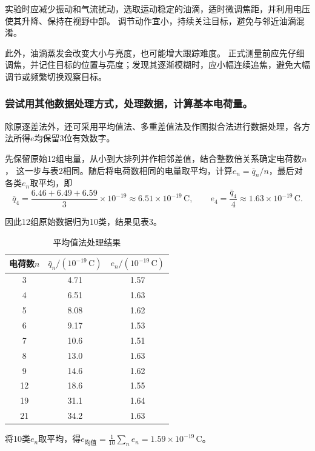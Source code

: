 \documentclass[10pt,a4paper]{ctexart} %
\begin{document}
    实验时应减少振动和气流扰动，选取运动稳定的油滴，适时微调焦距，并利用电压使其升降、保持在视野中部。
    调节动作宜小，持续关注目标，避免与邻近油滴混淆。
    
    此外，油滴蒸发会改变大小与亮度，也可能增大跟踪难度。
    正式测量前应先仔细调焦，并记住目标的位置与亮度；发现其逐渐模糊时，应小幅连续追焦，避免大幅调节或频繁切换观察目标。

    \subsubsection{尝试用其他数据处理方式，处理数据，计算基本电荷量。}
    \begingroup
    \setlength{\intextsep}{8pt}
    除原逐差法外，还可采用平均值法、多重差值法及作图拟合法进行数据处理，各方法所得$e$均保留3位有效数字。

    \par
    先保留原始12组电量，从小到大排列并作相邻差值，结合整数倍关系确定电荷数$n$，
    这一步与表2相同。随后将电荷数相同的电量取平均，计算$e_n=\bar q_n/n$，最后对各类$e_n$取平均，即
    \[
      \bar q_4=\frac{6.46+6.49+6.59}{3}\times10^{-19}
      \approx6.51\times10^{-19}\,\mathrm{C},\qquad
      e_4=\frac{\bar q_4}{4}\approx1.63\times10^{-19}\,\mathrm{C}.
    \]

    因此12组原始数据归为10类，结果见表3。

    \begin{table}[H]
      \centering
      \caption{平均值法处理结果}
      \begin{tabular}{ccc}
        \toprule
        电荷数$n$ & $\bar q_n/(10^{-19}\,\mathrm{C})$ & $e_n/(10^{-19}\,\mathrm{C})$ \\
        \midrule
        3 & 4.71 & 1.57 \\
        4 & 6.51 & 1.63 \\
        5 & 8.08 & 1.62 \\
        6 & 9.17 & 1.53 \\
        7 & 10.6 & 1.51 \\
        8 & 13.0 & 1.63 \\
        9 & 14.6 & 1.62 \\
        12 & 18.6 & 1.55 \\
        19 & 31.1 & 1.64 \\
        21 & 34.2 & 1.63 \\
        \bottomrule
      \end{tabular}
    \end{table}
    将10类$e_n$取平均，得$e_{\text{均值}}=\frac{1}{10}\sum_n e_n=1.59\times10^{-19}\,\mathrm{C}$。
\end{document}
